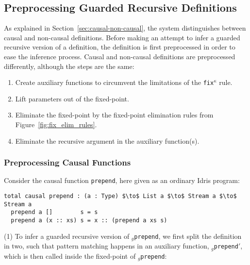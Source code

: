 

\subsection{Preprocessing Guarded Recursive Definitions}
\label{sec:impl-guard-recurs}
As explained in Section~\ref{sec:causal-non-causal}, the system distinguishes between
causal and non-causal definitions. Before making an attempt to infer a guarded
recursive version of a definition, the definition is first preprocessed in order
to ease the inference process. Causal and non-causal definitions are
preprocessed differently, although the steps are the same:

\begin{enumerate}
\item Create auxiliary functions to circumvent the limitations of the
  \texttt{fix$^\kappa$} rule.
\item Lift parameters out of the fixed-point.
\item Eliminate the fixed-point by the fixed-point elimination rules from
  Figure~\ref{fig:fix_elim_rules}.
\item Eliminate the recursive argument in the auxiliary function(s).
\end{enumerate}

\subsubsection{Preprocessing Causal Functions}
\label{sec:prepr-caus-funct}
 Consider the causal function \texttt{prepend}, here
given as an ordinary Idris program:
\begin{lstlisting}[mathescape]
  total causal prepend : (a : Type) $\to$ List a $\to$ Stream a $\to$ Stream a
  prepend a []        s = s
  prepend a (x :: xs) s = x :: (prepend a xs s)
\end{lstlisting}
(1) To infer a guarded recursive version of \texttt{$_g$prepend}, we first split the
definition in two, such that pattern matching happens in an auxiliary function,
\texttt{$_g$prepend$'$}, which is then called inside the fixed-point of \texttt{$_g$prepend}:

